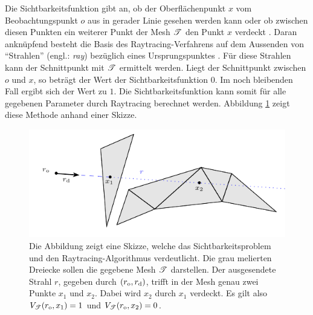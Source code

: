 		Die Sichtbarkeitsfunktion gibt an, ob der Oberflächenpunkt $x$ vom Beobachtungspunkt $o$ aus in gerader Linie gesehen werden kann oder ob zwischen diesen Punkten ein weiterer Punkt der Mesh $\mathscr{T}$ den Punkt $x$ verdeckt \cite[S.~30]{3d-visibility}.
		Daran anknüpfend besteht die Basis des Raytracing-Verfahrens auf dem Aussenden von \enquote{Strahlen} (engl.: \textit{ray}) bezüglich eines Ursprungspunktes \cite{pbrt3,parker-ray-tracing,nikodym-ray-tracing}.
		Für diese Strahlen kann der Schnittpunkt mit $\mathscr{T}$ ermittelt werden.
		Liegt der Schnittpunkt zwischen $o$ und $x$, so beträgt der Wert der Sichtbarkeitsfunktion $0$.
		Im noch bleibenden Fall ergibt sich der Wert zu $1$.
		Die Sichtbarkeitsfunktion kann somit für alle gegebenen Parameter durch Raytracing berechnet werden.
		Abbildung \ref{fig:ray_tracing-1} zeigt diese Methode anhand einer Skizze.

		\begin{figure}[h]
			\center
			\includegraphics{gg_fig/ray_tracing_1.pdf}
			\caption{Die Abbildung zeigt eine Skizze, welche das Sichtbarkeitsproblem und den Raytracing-Algorithmus verdeutlicht. Die grau melierten Dreiecke sollen die gegebene Mesh $\mathscr{T}$ darstellen. Der ausgesendete Strahl $r$, gegeben durch $(r_{\mathrm{o}},r_{\mathrm{d}})$, trifft in der Mesh genau zwei Punkte $x_1$ und $x_2$. Dabei wird $x_2$ durch $x_1$ verdeckt. Es gilt also $V_{\mathscr{T}}(r_{\mathrm{o}},x_1)=1$ und $V_{\mathscr{T}}(r_{\mathrm{o}},x_2)=0$.}
			\label{fig:ray_tracing-1}
		\end{figure}


